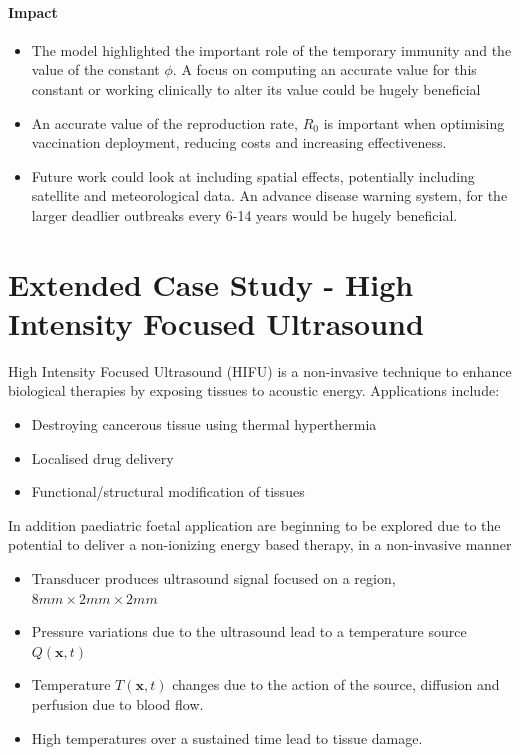\documentclass[11pt]{article} %
\begin{document}
\paragraph{Impact}

\begin{itemize}
	\item The model highlighted the important role of the temporary immunity and the value of the constant $\phi$. A focus on computing an accurate value for this constant or working clinically to alter its value could be hugely beneficial
	\item An accurate value of the reproduction rate, $ R_0 $ is important when optimising vaccination deployment, reducing costs and increasing effectiveness. 
	\item Future work could look at including spatial effects, potentially including satellite and meteorological data. An advance disease warning system, for the larger deadlier outbreaks every 6-14 years would be hugely beneficial. 
\end{itemize}
	\pagebreak
	\section{Extended Case Study - High Intensity Focused Ultrasound \label{extended}}
	
	High Intensity Focused Ultrasound (HIFU) is a non-invasive technique to enhance biological therapies by exposing tissues to acoustic energy. Applications include:
	\begin{itemize}
		\item Destroying cancerous tissue using thermal hyperthermia 
		\item Localised drug delivery 
		\item Functional/structural modification of tissues
	\end{itemize}
In addition paediatric foetal application are beginning to be explored due to the potential to deliver a non-ionizing energy based therapy, in a non-invasive manner 
	\begin{itemize}
		\item Transducer produces ultrasound signal focused on a region, $8mm\times2mm\times2mm$
		\item Pressure variations due to the ultrasound lead to a temperature source $Q(\textbf{x},t)$
		\item Temperature $T(\textbf{x},t)$ changes due to the action of the source, diffusion and perfusion due to blood flow. 
		\item High temperatures over a sustained time lead to tissue damage. 
	\end{itemize}
	
\end{document}
